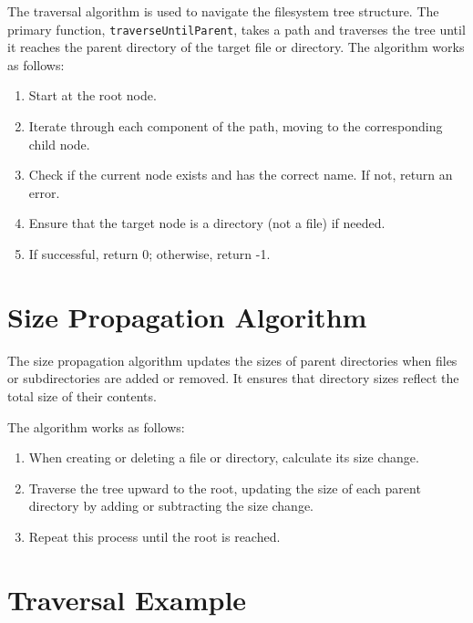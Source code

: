 \documentclass{article}
\begin{document}
The traversal algorithm is used to navigate the filesystem tree structure. The primary function, \texttt{traverseUntilParent}, takes a path and traverses the tree until it reaches the parent directory of the target file or directory. The algorithm works as follows:
\begin{enumerate}
    \item Start at the root node.
    \item Iterate through each component of the path, moving to the corresponding child node.
    \item Check if the current node exists and has the correct name. If not, return an error.
    \item Ensure that the target node is a directory (not a file) if needed.
    \item If successful, return 0; otherwise, return -1.
\end{enumerate}

\section{Size Propagation Algorithm}

The size propagation algorithm updates the sizes of parent directories when files or subdirectories are added or removed. It ensures that directory sizes reflect the total size of their contents.

The algorithm works as follows:
\begin{enumerate}
    \item When creating or deleting a file or directory, calculate its size change.
    \item Traverse the tree upward to the root, updating the size of each parent directory by adding or subtracting the size change.
    \item Repeat this process until the root is reached.
\end{enumerate}

\section{Traversal Example}
\end{document}
